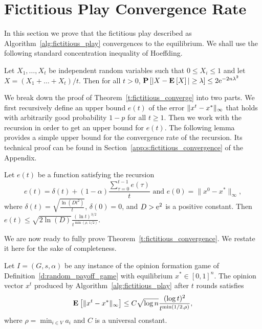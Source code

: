 \section{Fictitious Play Convergence Rate}\label{s:fictitious_convergence}
In this section we prove that the fictitious play described as
Algorithm~\ref{alg:fictitious_play} convergences to the equilibrium.
We shall use the following standard concentration inequality of Hoeffding.
\begin{lemma}\label{l:hoeffding}
  Let $X_1, \ldots, X_t$ be independent random variables such that
  $0 \leq X_i \leq 1$ and let $X = (X_1 + \ldots + X_t) / t$. Then
  for all $t > 0$,
  \(
    \Prob{ |X - \Exp X| \geq \lambda} \leq 2 \me^{-2 n \lambda^2}
  \)
\end{lemma}
We break down the proof of Theorem~\ref{t:fictitious_converge}
into two parts.  We first recursively define an upper bound $e(t)$
of the error $\| x^t - x^* \|_{\infty}$ that holds with arbitrarily
good probability $1-p$ for all $t \geq 1$. Then we work
with the recursion in order to get an upper bound for $e(t)$.
The following lemma provides a simple upper bound for the
convergence rate of the recursion. Its technical proof can
be found in Section~\ref{app:s:fictitious_convergence} of the Appendix.
\begin{lemma}\label{l:recursion_upper_bound}
  Let $e(t)$ be a function satisfying the recursion
  \[
    e(t) =
    \delta(t) + (1-\alpha)\frac{\sum_{\tau=0}^{t-1}e(\tau)}{t}
    \text{ and } e(0)=\|x^0 - x^*\|_{\infty},
  \]
  where \(\delta(t) = \sqrt{\frac{\ln(D t^2)}{t}} \), \(\delta(0) = 0 \),
  and $D > \mathrm{e}^2$ is a positive constant.  Then
  \(
    e(t) \leq
    \sqrt{2 \ln(D)} \frac{(\ln t)^{3/2}}{t^{\min(\rho,\, 1/2)}}.
  \)
\end{lemma}
We are now ready to fully prove Theorem~\ref{t:fictitious_convergence}.
We restate it here for the sake of completeness.
\begin{theorem}
  Let $I = (G,s, \alpha)$ be any instance of the opinion formation
  game of Definition~\ref{d:random_payoff_game} with equilibrium
  $x^* \in [0,1]^n$.  The opinion vector $x^t$ produced by
  Algorithm~\ref{alg:fictitious_play} after $t$ rounds satisfies
  \[
    \bm{\mathrm{E}}_{} \left[ \| x^t - x^* \|_{\infty} \right] \leq
    C \sqrt{\log n}\frac{(\log t)^{2}}{t^{\min(1/2,\rho)}},
  \]
  where $\rho = \min_{i \in V} a_i$ and $C$ is a universal constant.
\end{theorem}
